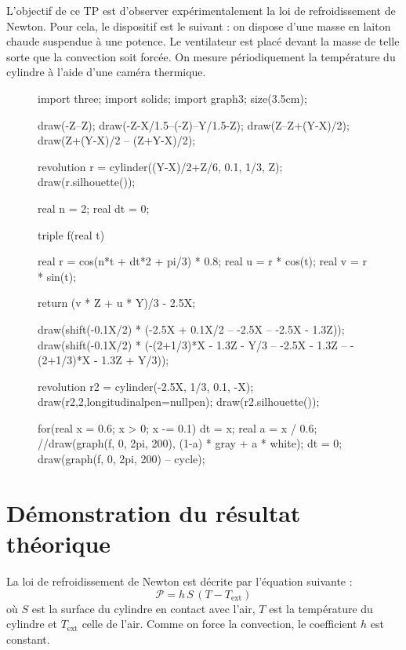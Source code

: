 \documentclass[a4paper]{report}
\begin{document}
	\begin{multicols}{2}
		L'objectif de ce TP est d'observer expérimentalement la loi de refroidissement de Newton. Pour cela, le dispositif est le suivant : on dispose d'une masse en laiton chaude suspendue à une potence. Le ventilateur est placé devant la masse de telle sorte que la convection soit forcée. On mesure périodiquement la température du cylindre à l'aide d'une caméra thermique.

		\begin{figure}[H]
			\centering
			\begin{asy}
				import three;
				import solids;
				import graph3;
				size(3.5cm);

				draw(-Z--Z);
				draw(-Z-X/1.5--(-Z)--Y/1.5-Z);
				draw(Z--Z+(Y-X)/2);
				draw(Z+(Y-X)/2 -- (Z+Y-X)/2);
				
				revolution r = cylinder((Y-X)/2+Z/6, 0.1, 1/3, Z);
				draw(r.silhouette());

				real n = 2;
				real dt = 0;

				triple f(real t) {
					real r = cos(n*t + dt*2 + pi/3) * 0.8;
					real u = r * cos(t);
					real v = r * sin(t);

					return (v * Z + u * Y)/3 - 2.5X;
				}

				draw(shift(-0.1X/2) * (-2.5X + 0.1X/2 -- -2.5X -- -2.5X - 1.3Z));
				draw(shift(-0.1X/2) * (-(2+1/3)*X - 1.3Z - Y/3 -- -2.5X - 1.3Z -- -(2+1/3)*X - 1.3Z + Y/3));

				revolution r2 = cylinder(-2.5X, 1/3, 0.1, -X);
				draw(r2,2,longitudinalpen=nullpen);
				draw(r2.silhouette());

				for(real x = 0.6; x > 0; x -= 0.1) {
					dt = x;
					real a = x / 0.6;
					//draw(graph(f, 0, 2pi, 200), (1-a) * gray + a * white);
				}
				dt = 0;
				draw(graph(f, 0, 2pi, 200) -- cycle);
			\end{asy}
		\end{figure}

		\section{Démonstration du résultat théorique}

		La loi de refroidissement de Newton est décrite par l'équation suivante : \[
			\mathcal{P} = h\,S\,(T - T_{\text{ext}})
		\] où $S$ est la surface du cylindre en contact avec l'air, $T$ est la température du cylindre et $T_{\text{ext}}$ celle de l'air. Comme on force la convection, le coefficient $h$ est constant.


\end{multicols}
\end{document}
